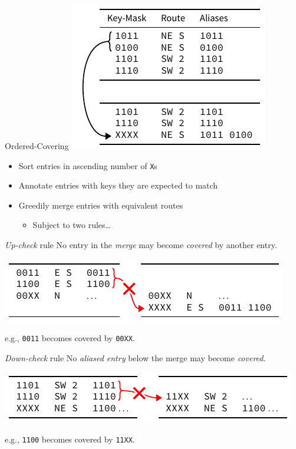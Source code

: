 \documentclass[t]{beamer}
\begin{document}
\begin{frame}{Ordered-Covering}
  \centering
  \includegraphics{aliases_example}

  \begin{itemize}
    \item Sort entries in ascending number of \texttt{X}s
    \item Annotate entries with keys they are expected to match
    \item Greedily merge entries with equivalent routes
      \begin{itemize}
        \item Subject to two rules\ldots
      \end{itemize}
  \end{itemize}
\end{frame}

\begin{frame}{\emph{Up-check} rule}
  No entry in the \emph{merge} may become \emph{covered} by another entry.

  \begin{center}
    \includegraphics{../figures/rule2a_example}
  \end{center}

  e.g., \texttt{0011} becomes covered by \texttt{00XX}.
\end{frame}

\begin{frame}{\emph{Down-check} rule}
  No \emph{aliased entry} below the merge may become \emph{covered}.

  \begin{center}
    \includegraphics{../figures/rule2b_example}
  \end{center}

  e.g., \texttt{1100} becomes covered by \texttt{11XX}.
\end{frame}
\end{document}
